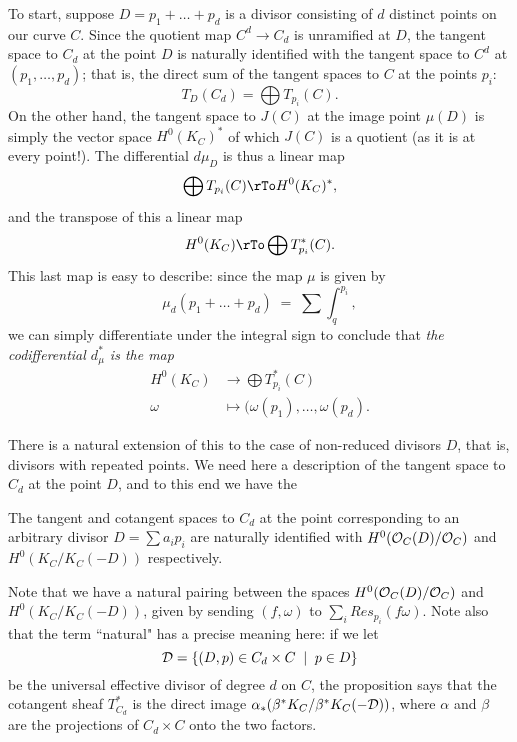 To start, suppose $D = p_1 + \dots + p_d$ is a divisor consisting of $d$ distinct points on our curve $C$. Since the quotient map $C^d \to C_d$ is unramified at $D$, the tangent space to $C_d$ at the point $D$ is naturally identified with the tangent space to $C^d$ at $(p_1,\dots,p_d)$; that is, the direct sum of the tangent spaces to $C$ at the points $p_i$:
$$
T_D(C_d) = \bigoplus T_{p_i}(C).
$$
On the other hand, the tangent space to $J(C)$ at the image point $\mu(D)$ is simply the vector space $H^0(K_C)^*$ of which $J(C)$ is a quotient (as it is at every point!). The differential $d\mu_D$ is thus a linear map
$$
\bigoplus T_{p_i}(C) \rTo H^0(K_C)^*,
$$
and the transpose of this a linear map
$$
H^0(K_C) \rTo \bigoplus T^*_{p_i}(C).
$$
This last map is easy to describe: since the map $\mu$ is given by 
$$
\mu_d(p_1 + \dots + p_d) \; = \; \sum \int_q^{p_i},
$$
we can simply differentiate under the integral sign to conclude that \emph{the codifferential $d_\mu^*$ is the map}
\begin{align*}
H^0(K_C) &\to \bigoplus T^*_{p_i}(C) \\
\omega &\mapsto (\omega(p_1), \dots, \omega(p_d).
\end{align*}

There is a natural extension of this to the case of non-reduced divisors $D$, that is, divisors with repeated points. We need here a description of the tangent space to $C_d$ at the point $D$, and to this end we have the

\begin{proposition}\label{symmetric product tangent space}
The tangent and cotangent spaces to $C_d$ at the point corresponding to an arbitrary divisor $D = \sum a_ip_i$ are naturally identified with $H^0(\cO_C(D)/\cO_C)$ and $H^0(K_C/K_C(-D))$ respectively.
\end{proposition}

Note that we have a natural pairing between the spaces $H^0(\cO_C(D)/\cO_C)$ and $H^0(K_C/K_C(-D))$, given by sending $(f, \omega)$ to $\sum_i Res_{p_i}(f\omega)$. Note also that the term ``natural" has a precise meaning here: if we let 
$$
\cD = \{ (D, p) \in C_d \times C \; \mid \; p \in D \}
$$
be the universal effective divisor of degree $d$ on $C$, the proposition says that the cotangent sheaf $T^*_{C_d}$ is the direct image $\alpha_*(\beta^*K_C/\beta^*K_C(-\cD))$, where $\alpha$ and $\beta$ are the projections of $C_d \times C$ onto the two factors.

